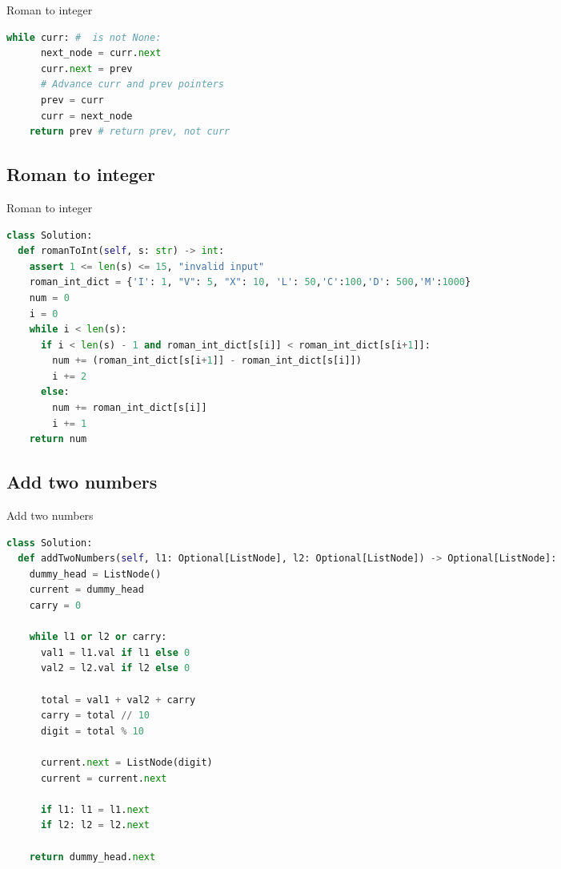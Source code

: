\documentclass[a4paper,12pt]{article}
\begin{document}
\begin{multicols}{2}
\begin{mycode}[label={lst:roman-to-integer}]{Roman to integer}
\begin{lstlisting}[language=Python]
    while curr: #  is not None:
      next_node = curr.next
      curr.next = prev
      # Advance curr and prev pointers
      prev = curr
      curr = next_node
    return prev # return prev, not curr
\end{lstlisting}
\end{mycode}


\subsection{Roman to integer}

\begin{mycode}[label={lst:roman-to-integer}]{Roman to integer}
\begin{lstlisting}[language=Python]
class Solution:
  def romanToInt(self, s: str) -> int:
    assert 1 <= len(s) <= 15, "invalid input"
    roman_int_dict = {'I': 1, "V": 5, "X": 10, 'L': 50,'C':100,'D': 500,'M':1000}
    num = 0
    i = 0
    while i < len(s):
      if i < len(s) - 1 and roman_int_dict[s[i]] < roman_int_dict[s[i+1]]:
        num += (roman_int_dict[s[i+1]] - roman_int_dict[s[i]])
        i += 2
      else:
        num += roman_int_dict[s[i]]
        i += 1
    return num
\end{lstlisting}
\end{mycode}


\subsection{Add two numbers}

\begin{mycode}[label={lst:add-two-numbers}]{Add two numbers}
\begin{lstlisting}[language=Python]
class Solution:
  def addTwoNumbers(self, l1: Optional[ListNode], l2: Optional[ListNode]) -> Optional[ListNode]:
    dummy_head = ListNode()
    current = dummy_head
    carry = 0

    while l1 or l2 or carry:
      val1 = l1.val if l1 else 0
      val2 = l2.val if l2 else 0

      total = val1 + val2 + carry
      carry = total // 10
      digit = total % 10

      current.next = ListNode(digit)
      current = current.next

      if l1: l1 = l1.next
      if l2: l2 = l2.next

    return dummy_head.next
\end{lstlisting}
\end{mycode}



\end{multicols}
\end{document}
